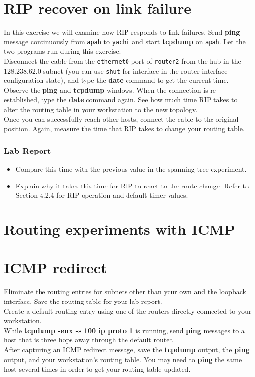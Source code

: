 \documentclass[10pt,a4paper]{article}
\numberwithin{equation}{section}
\numberwithin{figure}{section}
\numberwithin{table}{section}
\begin{document}
\section{RIP recover on link failure}
    In this exercise we will examine how RIP responds to link failures.
    Send \textbf{ping} message continuously from \texttt{apah} to \texttt{yachi} and start \textbf{tcpdump} on \texttt{apah}.
    Let the two programs run during this exercise. \\
    Disconnect the cable from the \texttt{ethernet0} port of \texttt{router2} from the hub in the 128.238.62.0 subnet (you can use \texttt{shut} for interface in the router interface configuration state), and type the \textbf{date} command to get the current time. \\
    Observe the \textbf{ping} and \textbf{tcpdump} windows.
    When the connection is re-established, type the \textbf{date}  command again.
    See how much time RIP takes to alter the routing table in your workstation to the new topology. \\
    Once you can successfully reach other hosts, connect the cable to the original position.
    Again, measure the time that RIP takes to change your routing table.
    \subsubsection*{Lab Report}
    \begin{itemize}
        \setlength{\itemindent}{0pt}
        \item Compare this time with the previous value in the spanning tree experiment.
        \item Explain why it takes this time for RIP to react to the route change.
        Refer to Section 4.2.4 for RIP operation and default timer values.
    \end{itemize}


\section*{Routing experiments with ICMP}
\section{ICMP redirect}
    Eliminate the routing entries for subnets other than your own and the loopback interface.
    Save the routing table for your lab report. \\
    Create a default routing entry using one of the routers directly connected to your workstation. \\
    While \textbf{tcpdump -enx -s 100 ip proto 1} is running, send \textbf{ping} messages to a host that is three hops away through the default router. \\
    After capturing an ICMP redirect message, save the \textbf{tcpdump} output, the \textbf{ping} output, and your workstation’s routing table.
    You may need to \textbf{ping} the same host several times in order to get your routing table updated.
\end{document}

